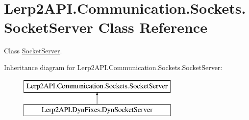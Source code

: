\hypertarget{class_lerp2_a_p_i_1_1_communication_1_1_sockets_1_1_socket_server}{}\section{Lerp2\+A\+P\+I.\+Communication.\+Sockets.\+Socket\+Server Class Reference}
\label{class_lerp2_a_p_i_1_1_communication_1_1_sockets_1_1_socket_server}


Class \hyperlink{class_lerp2_a_p_i_1_1_communication_1_1_sockets_1_1_socket_server}{Socket\+Server}.  


Inheritance diagram for Lerp2\+A\+P\+I.\+Communication.\+Sockets.\+Socket\+Server\+:\begin{figure}[H]
\begin{center}
\leavevmode
\includegraphics[height=2.000000cm]{class_lerp2_a_p_i_1_1_communication_1_1_sockets_1_1_socket_server}
\end{center}
\end{figure}
